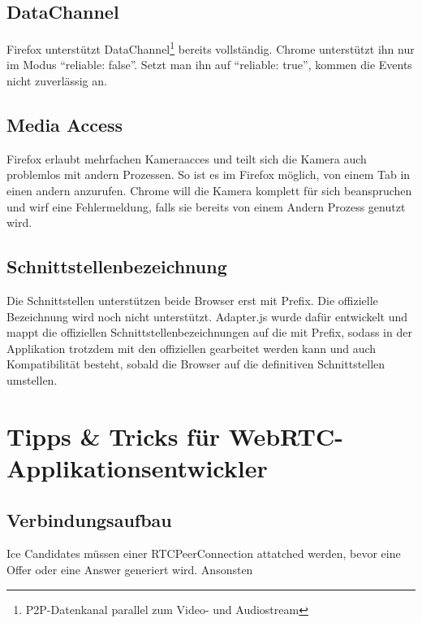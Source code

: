 		\subsection{DataChannel}
			Firefox unterstützt DataChannel\footnote{P2P-Datenkanal parallel zum Video-
			und Audiostream} bereits vollständig. Chrome unterstützt ihn nur im Modus
			"`reliable: false"'. Setzt man ihn auf "`reliable: true"', kommen die Events
			nicht zuverlässig an.
			
		\subsection{Media Access}
			Firefox erlaubt mehrfachen Kameraacces und teilt sich die Kamera auch problemlos mit andern Prozessen. So ist es im Firefox möglich, von einem Tab in einen andern anzurufen. Chrome will die Kamera komplett für sich beanspruchen und wirf eine Fehlermeldung, falls sie bereits von einem Andern Prozess genutzt wird.
			
		\subsection{Schnittstellenbezeichnung}
			Die Schnittstellen unterstützen beide Browser erst mit Prefix. Die offizielle Bezeichnung wird noch nicht unterstützt. Adapter.js wurde dafür entwickelt und mappt die offiziellen Schnittstellenbezeichnungen auf die mit Prefix, sodass in der Applikation trotzdem mit den offiziellen gearbeitet werden kann und auch Kompatibilität besteht, sobald die Browser auf die definitiven Schnittstellen umstellen.


	\section{Tipps \& Tricks für WebRTC-Applikationsentwickler}
		\subsection{Verbindungsaufbau}
			Ice Candidates müssen einer RTCPeerConnection attatched werden, bevor eine Offer oder eine Answer generiert wird. Ansonsten